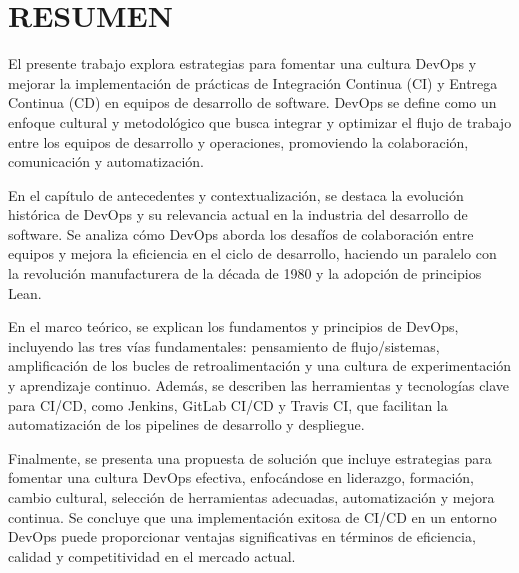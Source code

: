 \clearpage
{} 
    \setcounter{page}{2}
\thispagestyle{plain}
\section*{\centering RESUMEN}
\justify %
El presente trabajo explora estrategias para fomentar una cultura DevOps y mejorar la implementación de prácticas de Integración Continua (CI) y Entrega Continua (CD) en equipos de desarrollo de software. DevOps se define como un enfoque cultural y metodológico que busca integrar y optimizar el flujo de trabajo entre los equipos de desarrollo y operaciones, promoviendo la colaboración, comunicación y automatización. \newline

En el capítulo de antecedentes y contextualización, se destaca la evolución histórica de DevOps y su relevancia actual en la industria del desarrollo de software. Se analiza cómo DevOps aborda los desafíos de colaboración entre equipos y mejora la eficiencia en el ciclo de desarrollo, haciendo un paralelo con la revolución manufacturera de la década de 1980 y la adopción de principios Lean.\newline

En el marco teórico, se explican los fundamentos y principios de DevOps, incluyendo las tres vías fundamentales: pensamiento de flujo/sistemas, amplificación de los bucles de retroalimentación y una cultura de experimentación y aprendizaje continuo. Además, se describen las herramientas y tecnologías clave para CI/CD, como Jenkins, GitLab CI/CD y Travis CI, que facilitan la automatización de los pipelines de desarrollo y despliegue.\newline

Finalmente, se presenta una propuesta de solución que incluye estrategias para fomentar una cultura DevOps efectiva, enfocándose en liderazgo, formación, cambio cultural, selección de herramientas adecuadas, automatización y mejora continua. Se concluye que una implementación exitosa de CI/CD en un entorno DevOps puede proporcionar ventajas significativas en términos de eficiencia, calidad y competitividad en el mercado actual.\newline
\clearpage
    